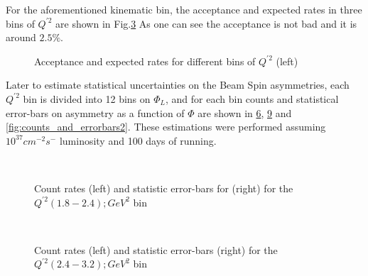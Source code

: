 For the aforementioned kinematic bin, the acceptance and expected rates in three bins of $Q^{\prime 2}$ are shown in Fig.\ref{fig:Acc_and_rates_Qp2}
As one can see the acceptance is not bad and it is around $2.5\%$.
\begin{figure}[!htb]
 \centering
   \begin{subfigure}{0.48 \tw}
  \caption{}
  \label{fig:Acc_Qp2}
 \end{subfigure}
 \begin{subfigure}{0.48 \tw}
  \caption{}
  \label{fig:h_Qp2_rates1}
 \end{subfigure}
\caption{Acceptance and expected rates for different bins of $Q^{\prime 2}$ (left)}
\label{fig:Acc_and_rates_Qp2}
\end{figure}
Later to estimate statistical uncertainties on the Beam Spin asymmetries, each $Q^{\prime 2}$ bin is divided into 12 bins on $\Phi_{L}$, and for each bin 
counts and statistical error-bars on asymmetry as a function of $\Phi$
 are shown in \ref{fig:counts_and_errorbars0}, \ref{fig:counts_and_errorbar1} and \ref{fig:counts_and_errorbars2}.
 These estimations were performed assuming $10^{37}cm^{-2}s^{-}$ luminosity and 100 days of running.
\begin{figure}[!htb]
 \centering
   \begin{subfigure}{0.48 \tw}
  \caption{}
  \label{fig:PHI_DVCS_rates_0}
 \end{subfigure}
 \begin{subfigure}{0.48 \tw}
  \caption{}
  \label{fig:Asym_errorbars_0}
 \end{subfigure}\\
\caption{Count rates (left) and statistic error-bars for (right) for the $Q^{\prime2}(1.8-2.4); GeV^{2}$ bin}
\label{fig:counts_and_errorbars0}
\end{figure}
\begin{figure}[!htb]
 \centering
   \begin{subfigure}{0.48 \tw}
  \caption{}
  \label{fig:PHI_DVCS_rates_1}
 \end{subfigure}
 \begin{subfigure}{0.48 \tw}
  \caption{}
  \label{fig:Asym_errorbars_1}
 \end{subfigure}\\
\caption{Count rates (left) and statistic error-bars (right) for the $Q^{\prime2}(2.4 - 3.2); GeV^{2}$ bin}
\label{fig:counts_and_errorbar1}
\end{figure}
